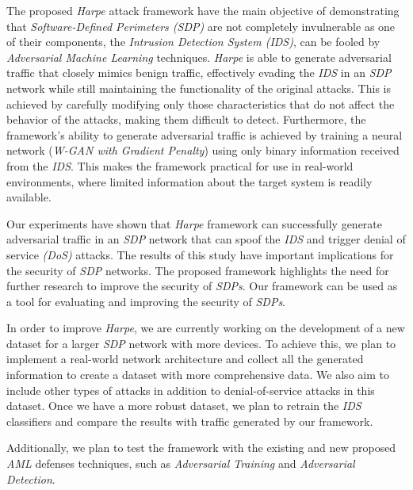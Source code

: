 The proposed \textit{Harpe} attack framework have the main objective of demonstrating that
\textit{Software-Defined Perimeters (SDP)} are not completely invulnerable as one of their components, the
\textit{Intrusion Detection System (IDS)}, can be fooled by \textit{Adversarial Machine Learning} techniques.
\textit{Harpe} is able to generate adversarial traffic that closely mimics benign traffic, effectively evading the
\textit{IDS} in an \textit{SDP} network while still maintaining the functionality of the original attacks.
This is achieved by carefully modifying only those characteristics that do not affect the behavior of the attacks,
making them difficult to detect.
Furthermore, the framework's ability to generate adversarial traffic is achieved by training a neural network
(\textit{W-GAN with Gradient Penalty}) using only binary information received from the \textit{IDS}.
This makes the framework practical for use in real-world environments, where limited information about the target
system is readily available.

Our experiments have shown that \textit{Harpe} framework can successfully generate adversarial traffic in an
\textit{SDP} network that can spoof the \textit{IDS} and trigger denial of service \textit{(DoS)} attacks.
The results of this study have important implications for the security of \textit{SDP} networks.
The proposed framework highlights the need for further research to improve the security of \textit{SDPs}.
Our framework can be used as a tool for evaluating and improving the security of \textit{SDPs}.

In order to improve \textit{Harpe}, we are currently working on the development of a new dataset for a larger
\textit{SDP} network with more devices.
To achieve this, we plan to implement a real-world network architecture and collect all the generated information to
create a dataset with more comprehensive data.
We also aim to include other types of attacks in addition to denial-of-service attacks in this dataset.
Once we have a more robust dataset, we plan to retrain the \textit{IDS} classifiers and compare the results with
traffic generated by our framework.

Additionally, we plan to test the framework with the existing and new proposed \textit{AML} defenses techniques,
such as \textit{Adversarial Training} and \textit{Adversarial Detection}.
